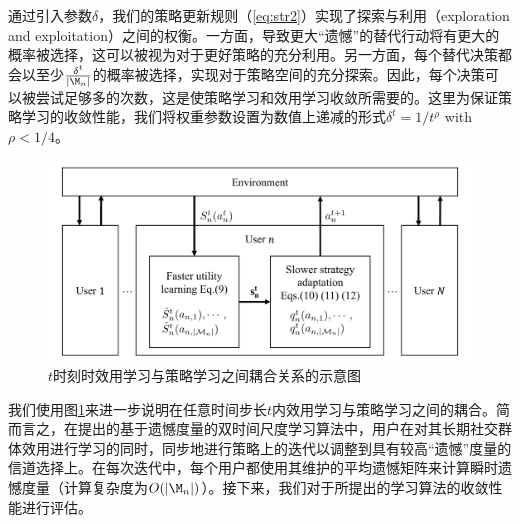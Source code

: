 通过引入参数$\delta$，我们的策略更新规则（\ref{eq:str2}）实现了探索与利用（exploration and exploitation）之间的权衡。一方面，导致更大“遗憾”的替代行动将有更大的概率被选择，这可以被视为对于更好策略的充分利用。另一方面，每个替代决策都会以至少$\frac{\delta^t}{|\M_n|}$的概率被选择，实现对于策略空间的充分探索。因此，每个决策可以被尝试足够多的次数，这是使策略学习和效用学习收敛所需要的。这里为保证策略学习的收敛性能，我们将权重参数设置为数值上递减的形式$\delta^t=1/t^\rho$ with $\rho<1/4$。
\begin{figure}[!t]
\centering
\includegraphics[scale=0.46]{./pic/scheme2.pdf}
\caption{$t$时刻时效用学习与策略学习之间耦合关系的示意图}\label{fg:scheme}
\end{figure}
我们使用图\ref{fg:scheme}来进一步说明在任意时间步长$t$内效用学习与策略学习之间的耦合。简而言之，在提出的基于遗憾度量的双时间尺度学习算法中，用户在对其长期社交群体效用进行学习的同时，同步地进行策略上的迭代以调整到具有较高“遗憾”度量的信道选择上。在每次迭代中，每个用户都使用其维护的平均遗憾矩阵来计算瞬时遗憾度量（计算复杂度为$O(|\M_n|)$）。接下来，我们对于所提出的学习算法的收敛性能进行评估。
